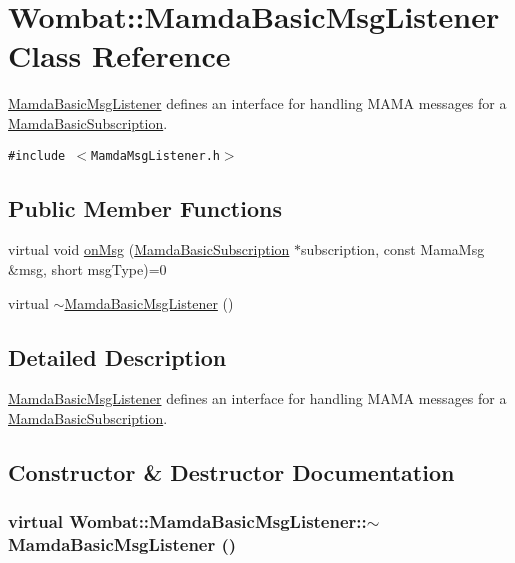 \hypertarget{classWombat_1_1MamdaBasicMsgListener}{
\section{Wombat::Mamda\-Basic\-Msg\-Listener Class Reference}
\label{classWombat_1_1MamdaBasicMsgListener}
}
\hyperlink{classWombat_1_1MamdaBasicMsgListener}{Mamda\-Basic\-Msg\-Listener} defines an interface for handling MAMA messages for a \hyperlink{classWombat_1_1MamdaBasicSubscription}{Mamda\-Basic\-Subscription}.  


{\tt \#include $<$Mamda\-Msg\-Listener.h$>$}

\subsection*{Public Member Functions}
\begin{CompactItemize}
\item 
virtual void \hyperlink{classWombat_1_1MamdaBasicMsgListener_a0b8b6757cdac7ccd75e4609ff36a36a}{on\-Msg} (\hyperlink{classWombat_1_1MamdaBasicSubscription}{Mamda\-Basic\-Subscription} $\ast$subscription, const Mama\-Msg \&msg, short msg\-Type)=0
\item 
virtual \hyperlink{classWombat_1_1MamdaBasicMsgListener_24fbc65dfb28c6d4d1490b5e429b58e3}{$\sim$Mamda\-Basic\-Msg\-Listener} ()
\end{CompactItemize}


\subsection{Detailed Description}
\hyperlink{classWombat_1_1MamdaBasicMsgListener}{Mamda\-Basic\-Msg\-Listener} defines an interface for handling MAMA messages for a \hyperlink{classWombat_1_1MamdaBasicSubscription}{Mamda\-Basic\-Subscription}. 



\subsection{Constructor \& Destructor Documentation}
\hypertarget{classWombat_1_1MamdaBasicMsgListener_24fbc65dfb28c6d4d1490b5e429b58e3}{
\subsubsection[$\sim$MamdaBasicMsgListener]{\setlength{\rightskip}{0pt plus 5cm}virtual Wombat::Mamda\-Basic\-Msg\-Listener::$\sim$Mamda\-Basic\-Msg\-Listener ()}}
\label{classWombat_1_1MamdaBasicMsgListener_24fbc65dfb28c6d4d1490b5e429b58e3}




